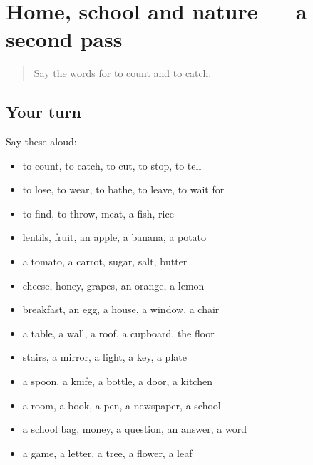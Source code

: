 \section[(dialogue)]{Home, school and nature — a second pass}

\label{lesson:PA-R73-second-pass-home-school-and-nature}



\begin{quote}
Say the words for to count and to catch.
\end{quote}

\subsection*{Your turn}
Say these aloud:

\begin{itemize}
\raggedright
  \item to count, to catch, to cut, to stop, to tell
  \item to lose, to wear, to bathe, to leave, to wait for
  \item to find, to throw, meat, a fish, rice
  \item lentils, fruit, an apple, a banana, a potato
  \item a tomato, a carrot, sugar, salt, butter
  \item cheese, honey, grapes, an orange, a lemon
  \item breakfast, an egg, a house, a window, a chair
  \item a table, a wall, a roof, a cupboard, the floor
  \item stairs, a mirror, a light, a key, a plate
  \item a spoon, a knife, a bottle, a door, a kitchen
  \item a room, a book, a pen, a newspaper, a school
  \item a school bag, money, a question, an answer, a word
  \item a game, a letter, a tree, a flower, a leaf
\end{itemize}

